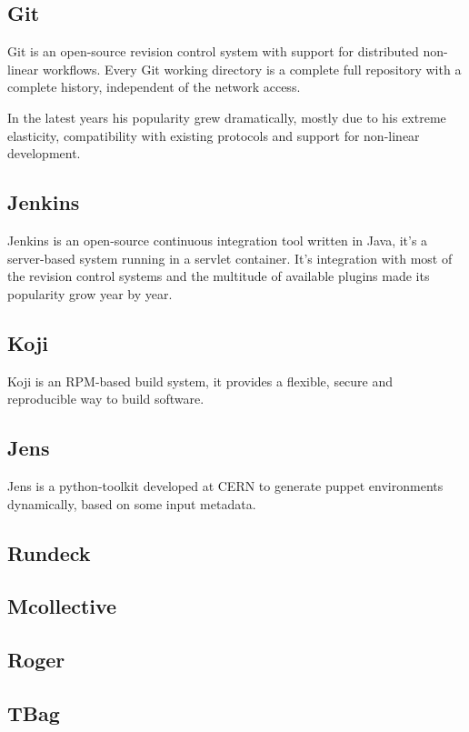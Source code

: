 \subsection{Git}

Git is an open-source revision control system with support for distributed
non-linear workflows. Every Git working directory is a complete full
repository with a complete history, independent of the network access.

In the latest years his popularity grew dramatically, mostly due to his
extreme elasticity, compatibility with existing protocols and support for
non-linear development.

\subsection{Jenkins}

Jenkins is an open-source continuous integration tool written in Java,
it's a server-based system running in a servlet container. It's
integration with most of the revision control systems and the multitude of
available plugins made its popularity grow year by year.


\subsection{Koji}

Koji is an RPM-based build system, it provides a flexible, secure and
reproducible way to build software.


\subsection{Jens}

Jens is a python-toolkit developed at CERN to generate puppet environments
dynamically, based on some input metadata.


\subsection{Rundeck}
\subsection{Mcollective}
\subsection{Roger}
\subsection{TBag}

